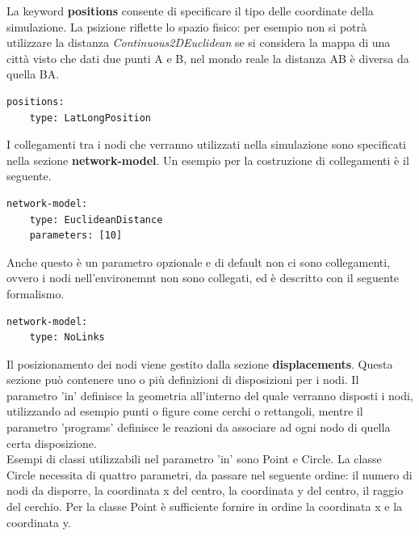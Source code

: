 \documentclass[12pt,a4paper,openright,twoside]{report}
\begin{document}
La keyword \textbf{positions} consente di specificare il tipo delle coordinate della simulazione. La psizione riflette lo spazio fisico: per esempio non si potr\`a utilizzare la distanza \textit{Continuous2DEuclidean} se si considera la mappa di una citt\`a visto che dati due punti A e B, nel mondo reale la distanza AB \`e diversa da quella BA.
\medskip
\begin{lstlisting}[firstnumber=last,caption={Posizioni}]
  positions:
    type: LatLongPosition
\end{lstlisting}

I collegamenti tra i nodi che verranno utilizzati nella simulazione sono specificati nella sezione \textbf{network-model}. Un esempio per la costruzione di collegamenti \`e il seguente.
\medskip
\begin{lstlisting}[firstnumber=last,caption={Funzione linking-rule}]
  network-model:
    type: EuclideanDistance
    parameters: [10]
\end{lstlisting}
Anche questo \`e un parametro opzionale e di default non ci sono collegamenti, ovvero i nodi nell'environemnt non sono collegati, ed \`e descritto con il seguente formalismo.
\medskip
\begin{lstlisting}[firstnumber=last,caption={Default linking-rule}]
  network-model:
    type: NoLinks
\end{lstlisting}

Il posizionamento dei nodi viene gestito dalla sezione \textbf{displacements}. Questa sezione pu\`o contenere uno o pi\`u definizioni di disposizioni per i nodi.
Il parametro 'in' definisce la geometria all'interno del quale verranno disposti i nodi, utilizzando ad esempio punti o figure come cerchi o rettangoli, mentre il parametro 'programs' definisce le reazioni da associare ad ogni nodo di quella certa disposizione.
\\
Esempi di classi utilizzabili nel parametro 'in' sono Point e Circle.
La classe Circle necessita di quattro parametri, da passare nel seguente ordine: il numero di nodi da disporre, la coordinata x del centro, la coordinata y del centro, il raggio del cerchio. Per la classe Point \`e sufficiente fornire in ordine la coordinata x e la coordinata y.
\end{document}
